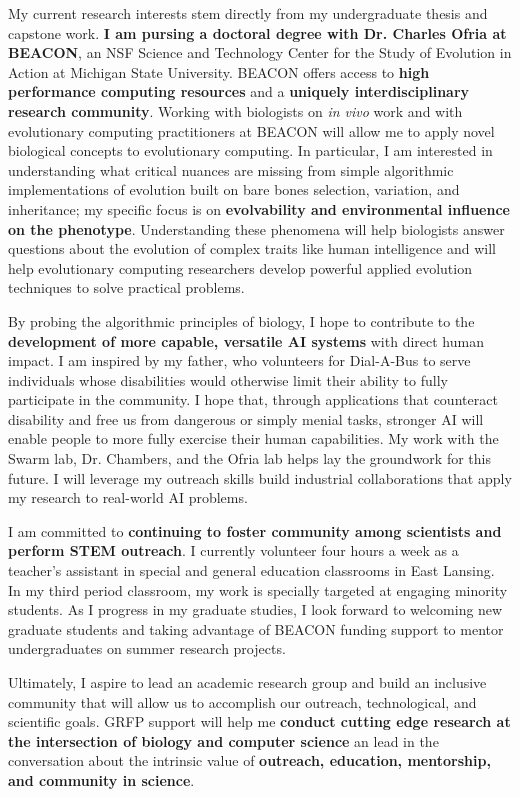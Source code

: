\noindent
\underline{}
My current research interests stem directly from my undergraduate thesis and capstone work.
\textbf{I am pursing a doctoral degree with Dr. Charles Ofria at BEACON}, an NSF Science and Technology Center for the Study of Evolution in Action at Michigan State University.
BEACON offers access to \textbf{high performance computing resources} and a \textbf{uniquely interdisciplinary research community}.
Working with biologists on \textit{in vivo} work and with evolutionary computing practitioners at BEACON will allow me to apply novel biological concepts to evolutionary computing.
In particular, I am interested in understanding what critical nuances are missing from simple algorithmic implementations of evolution built on bare bones selection, variation, and inheritance;
my specific focus is on \textbf{evolvability and environmental influence on the phenotype}.
Understanding these phenomena will help biologists answer questions about the evolution of complex traits like human intelligence and will help evolutionary computing researchers develop powerful applied evolution techniques to solve practical problems.

By probing the algorithmic principles of biology, I hope to contribute to the \textbf{development of more capable, versatile AI systems} with direct human impact.
I am inspired by my father, who volunteers for Dial-A-Bus to serve individuals whose disabilities would otherwise limit their ability to fully participate in the community.
I hope that, through applications that counteract disability and free us from dangerous or simply menial tasks, stronger AI will enable people to more fully exercise their human capabilities.
My work with the Swarm lab, Dr. Chambers, and the Ofria lab helps lay the groundwork for this future.
I will leverage my outreach skills build industrial collaborations that apply my research to real-world AI problems.

I am committed to \textbf{continuing to foster community among scientists and perform STEM outreach}.
I currently volunteer four hours a week as a teacher's assistant in special and general education classrooms in East Lansing.
In my third period classroom, my work is specially targeted at engaging minority students.
As I progress in my graduate studies, I look forward to welcoming new graduate students and taking advantage of BEACON funding support to mentor undergraduates on summer research projects.

Ultimately, I aspire to lead an academic research group and build an inclusive community that will allow us to accomplish our outreach, technological, and scientific goals.
GRFP support will help me \textbf{conduct cutting edge research at the intersection of biology and computer science} an lead in the conversation about the intrinsic value of \textbf{outreach, education, mentorship, and community in science}.
